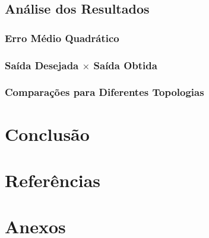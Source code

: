 \documentclass[12pt,a4paper]{article}
\begin{document}
\subsection{Análise dos Resultados}
\subsubsection{Erro Médio Quadrático}
\subsubsection{Saída Desejada $\times$ Saída Obtida}
\subsubsection{Comparações para Diferentes Topologias}
\section{Conclusão}
\section{Referências}
\section{Anexos}
\end{document}
